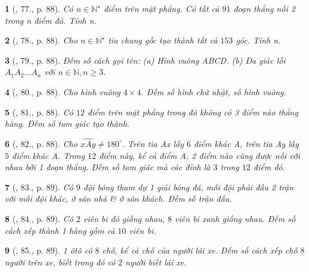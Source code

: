 \documentclass{article}
\newtheorem{baitoan}{}
\begin{document}
\begin{baitoan}[\cite{Binh_Toan_6_tap_2}, 77., p. 88]
	Có $n\in\mathbb{N}^\star$ điểm trên mặt phẳng. Có tất cả $91$ đoạn thẳng nối 2 trong n điểm đó. Tính n.
\end{baitoan}

\begin{baitoan}[\cite{Binh_Toan_6_tap_2}, 78., p. 88]
	Cho $n\in\mathbb{N}^\star$ tia chung gốc tạo thành tất cả $153$ góc. Tính n.
\end{baitoan}

\begin{baitoan}[\cite{Binh_Toan_6_tap_2}, 79., p. 88]
	Đếm số cách gọi tên: (a) Hình vuông ABCD. (b) Đa giác lồi $A_1A_2\ldots A_n$ với $n\in\mathbb{N},n\ge3$.
\end{baitoan}

\begin{baitoan}[\cite{Binh_Toan_6_tap_2}, 80., p. 88]
	Cho hình vuông $4\times4$. Đếm số hình chữ nhật, số hình vuông.
\end{baitoan}

\begin{baitoan}[\cite{Binh_Toan_6_tap_2}, 81., p. 88]
	Có $12$ điểm trên mặt phẳng trong đó không có 3 điểm nào thẳng hàng. Đếm số tam giác tạo thành.
\end{baitoan}

\begin{baitoan}[\cite{Binh_Toan_6_tap_2}, 82., p. 88]
	Cho $\widehat{xAy}\ne180^\circ$. Trên tia Ax lấy $6$ điểm khác A, trên tia Ay lấy $5$ điểm khác A. Trong $12$ điểm này, kể cả điểm A, 2 điểm nào cũng được nối với nhau bởi 1 đoạn thẳng. Đếm số tam giác mà các đỉnh là $3$ trong $12$ điểm đó.
\end{baitoan}

\begin{baitoan}[\cite{Binh_Toan_6_tap_2}, 83., p. 89]
	Có $9$ đội bóng tham dự 1 giải bóng đá, mỗi đội phải đấu 2 trận với mỗi đội khác, ở sân nhà \& ở sân khách. Đếm số trận đấu.
\end{baitoan}

\begin{baitoan}[\cite{Binh_Toan_6_tap_2}, 84., p. 89]
	Có $2$ viên bi đỏ giống nhau, $8$ viên bi xanh giống nhau. Đếm số cách xếp thành 1 hàng gồm cả $10$ viên bi.
\end{baitoan}

\begin{baitoan}[\cite{Binh_Toan_6_tap_2}, 85., p. 89]
	1 ôtô có $8$ chỗ, kể cả chỗ của người lái xe. Đếm số cách xếp chỗ $8$ người trên xe, biết trong đó có $2$ người biết lái xe.
\end{baitoan}
\end{document}
